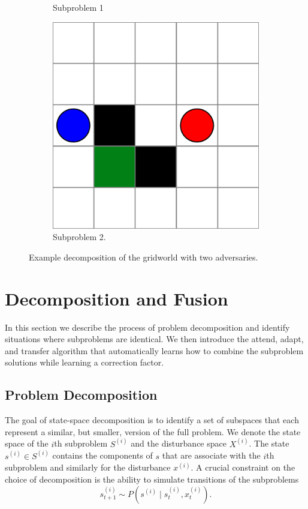 \begin{figure}
\begin{subfigure}[b]{0.25\textwidth}
        \caption{Subproblem 1}
        \label{fig:ch6_subg1}
    \end{subfigure}
    \hfill
    \begin{subfigure}[b]{0.25\textwidth}
        \centering
        \includegraphics[width=\textwidth]{figures/problem_decomposition/g_sub2.pdf}
        \caption{Subproblem 2.}
        \label{fig:ch6_subg2}
    \end{subfigure}
    \caption{Example decomposition of the gridworld with two adversaries.}
    \label{fig:adv_gridworld_decomp}
\end{figure}

\section{Decomposition and Fusion}
In this section we describe the process of problem decomposition and identify situations where subproblems are identical. We then introduce the attend, adapt, and transfer algorithm that automatically learns how to combine the subproblem solutions while learning a correction factor. 

\subsection{Problem Decomposition}
The goal of state-space decomposition is to identify a set of subspaces that each represent a similar, but smaller, version of the full problem. We denote the state space of the $i$th subproblem $S^{(i)}$ and the disturbance space $X^{(i)}$. The state $s^{(i)} \in S^{(i)}$ contains the components of $s$ that are associate with the $i$th subproblem and similarly for the disturbance $x^{(i)}$. A crucial constraint on the choice of decomposition is the ability to simulate transitions of the subproblems
\begin{equation}
    s_{t+1}^{(i)} \sim P( s^{(i)} \mid s_t^{(i)}, x_t^{(i)} ) \text{.}
\end{equation}

